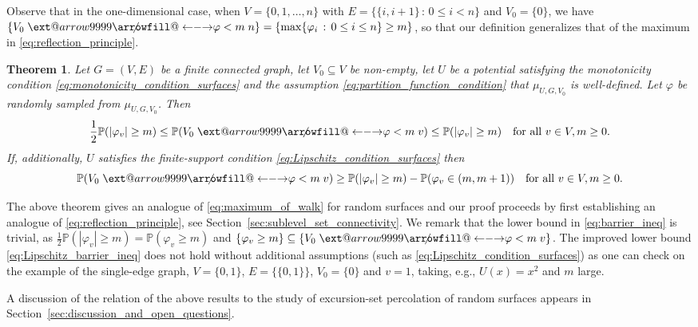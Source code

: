 \documentclass[english]{article}
\makeatletter
\newtheorem{theorem}[counter]{Theorem}
\newcommand\xleftrightarrow[2][]{%
  \ext@arrow 9999{\longleftrightarrowfill@}{#1}{#2}}
\newcommand\longleftrightarrowfill@{%
  \arrowfill@\leftarrow\relbar\rightarrow}
\theoremstyle{plain}
\theoremstyle{plain}
\makeatother
\begin{document}
Observe that in the one-dimensional case, when $V = \{0,1,\ldots,
n\}$ with $E = \{\{i,i+1\}\,:\,0\le i<n\}$ and $V_0 = \{0\}$, we
have $\{V_0 \centernot{\xleftrightarrow{\varphi< m}} n\} =
\{\max\{\varphi_i\,:\,0\le i\le n\}\ge m\}$, so that our definition
generalizes that of the maximum in \eqref{eq:reflection_principle}.

\begin{theorem}\label{thm:reflection_principle}
Let $G=(V,E)$ be a finite connected graph, let $V_0\subseteq V$ be
non-empty, let $U$ be a potential satisfying the monotonicity
condition \eqref{eq:monotonicity_condition_surfaces} and the
assumption \eqref{eq:partition_function_condition} that
$\mu_{U,G,V_0}$ is well-defined. Let $\varphi$ be randomly sampled
from $\mu_{U,G,V_{0}}$. Then
\begin{equation}\label{eq:barrier_ineq}
  \frac{1}{2}\mathbb{P}(|\varphi_v|\ge m)\le \mathbb{P}(V_0
\centernot{\xleftrightarrow{\varphi< m}} v)\le
\mathbb{P}(|\varphi_v|\ge m)\quad \text{for all $v\in V,
  m\ge 0$}.
\end{equation}
If, additionally, $U$ satisfies the finite-support condition
\eqref{eq:Lipschitz_condition_surfaces} then
\begin{equation}\label{eq:Lipschitz_barrier_ineq}
  \mathbb{P}(V_0
\centernot{\xleftrightarrow{\varphi< m}} v)\ge
\mathbb{P}(|\varphi_v|\ge m) - \mathbb{P}(\varphi_v\in(m,m+1))\quad
\text{for all $v\in V,
  m\ge 0$}.
\end{equation}
\end{theorem}
The above theorem gives an analogue of \eqref{eq:maximum_of_walk}
for random surfaces and our proof proceeds by first establishing an
analogue of \eqref{eq:reflection_principle}, see Section~\ref{sec:sublevel_set_connectivity}. We
remark that the lower bound in \eqref{eq:barrier_ineq} is trivial,
as $\frac{1}{2}\mathbb{P}(|\varphi_v|\ge m) =
\mathbb{P}(\varphi_v\ge m)$ and $\{\varphi_v\ge m\}\subseteq \{V_0
\centernot{\xleftrightarrow{\varphi< m}} v\}$. The improved lower
bound \eqref{eq:Lipschitz_barrier_ineq} does not hold without
additional assumptions (such as
\eqref{eq:Lipschitz_condition_surfaces}) as one can check on the
example of the single-edge graph, $V = \{0,1\}$, $E = \{\{0,1\}\}$,
$V_0 = \{0\}$ and $v = 1$, taking, e.g., $U(x) = x^2$ and $m$ large.

A discussion of the relation of the above results to the study of
excursion-set percolation of random surfaces appears in
Section~\ref{sec:discussion_and_open_questions}.
\end{document}
